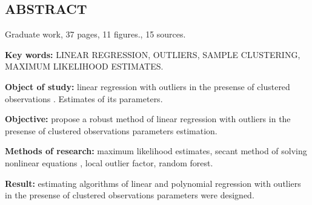 \newpage

\begin{center}
    \section*{ABSTRACT}
\end{center}

Graduate work, 37 pages, 11 figures., 15 sources.

\textbf{Key words:} LINEAR REGRESSION, OUTLIERS, SAMPLE CLUSTERING, MAXIMUM LIKELIHOOD ESTIMATES.

\textbf{Object of study:} linear regression with outliers in the presense of clustered observations . Estimates of its parameters.

\textbf{Objective:} propose a robust method of linear regression with outliers in the presense of clustered observations parameters estimation.

\textbf{Methods of research:} maximum likelihood estimates, secant method of solving nonlinear equations , local outlier factor, random forest.

\textbf{Result:} estimating algorithms of linear and polynomial regression with outliers in the presense of clustered observations parameters were designed.
